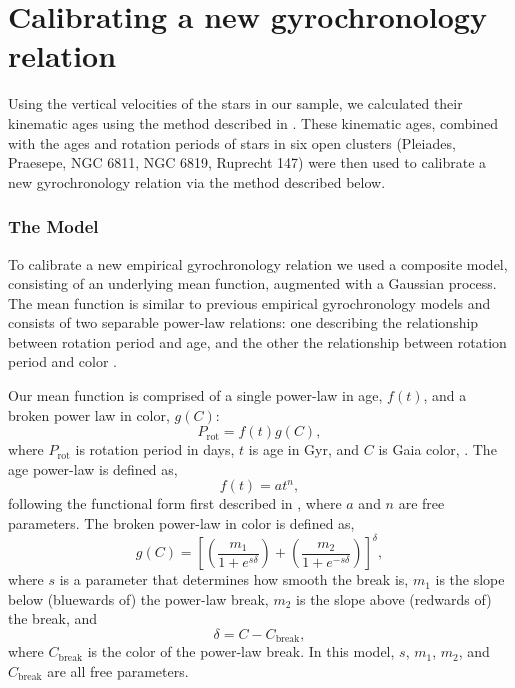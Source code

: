 \section{Calibrating a new gyrochronology relation}
\label{sec:gyro_calibration}

Using the vertical velocities of the stars in our sample, we calculated their
kinematic ages using the method described in \citet{lu2020}.
These kinematic ages, combined with the ages and rotation periods of stars in
six open clusters (Pleiades, Praesepe, NGC 6811, NGC 6819, Ruprecht 147) were
then used to calibrate a new gyrochronology relation via the method described
below.

\subsubsection{The Model}

To calibrate a new empirical gyrochronology relation we used a composite
model, consisting of an underlying mean function, augmented with a Gaussian
process.
The mean function is similar to previous empirical gyrochronology models and
consists of two separable power-law relations: one describing the relationship
between rotation period and age, and the other the relationship between
rotation period and color \citep[\eg][]{barnes2003, barnes2007, mamajek2008,
meibom2015, angus2015, angus2019}.

Our mean function is comprised of a single power-law in age, $f(t)$, and a
broken power law in color, $g(C)$:
\begin{equation}
P_\mathrm{rot} = f(t) g(C),
\end{equation}
where $P_\mathrm{rot}$ is rotation period in days, $t$ is age in Gyr, and $C$
is Gaia color, \gcolor.
The age power-law is defined as,
\begin{equation}
f(t) = at^n,
\end{equation}
following the functional form first described in \citet{barnes2003}, where $a$
and $n$ are free parameters.
The broken power-law in color is defined as,
\begin{equation}
    g(C) = \left[
\left(\frac{m_1}{1 + e^{s \delta}}\right)
    + \left(\frac{m_2}{1 + e^{-s \delta}}\right)\right]^\delta,
\end{equation}
where $s$ is a parameter that determines how smooth the break is, $m_1$ is the
slope below (bluewards of) the power-law break, $m_2$ is the slope above
(redwards of) the break, and
\begin{equation}
\delta = C - C_\mathrm{break},
\end{equation}
where $C_\mathrm{break}$ is the color of the power-law break.
In this model, $s$, $m_1$, $m_2$, and $C_\mathrm{break}$ are all free
parameters.

